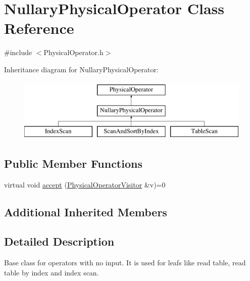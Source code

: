 \hypertarget{class_nullary_physical_operator}{\section{Nullary\+Physical\+Operator Class Reference}
\label{class_nullary_physical_operator}
}


{\ttfamily \#include $<$Physical\+Operator.\+h$>$}

Inheritance diagram for Nullary\+Physical\+Operator\+:\begin{figure}[H]
\begin{center}
\leavevmode
\includegraphics[height=3.000000cm]{class_nullary_physical_operator}
\end{center}
\end{figure}
\subsection*{Public Member Functions}
\begin{DoxyCompactItemize}
\item 
virtual void \hyperlink{class_nullary_physical_operator_a053a51bc73b06d883fba982adeeb122c}{accept} (\hyperlink{class_physical_operator_visitor}{Physical\+Operator\+Visitor} \&v)=0
\end{DoxyCompactItemize}
\subsection*{Additional Inherited Members}


\subsection{Detailed Description}
Base class for operators with no input. It is used for leafs like read table, read table by index and index scan. 

